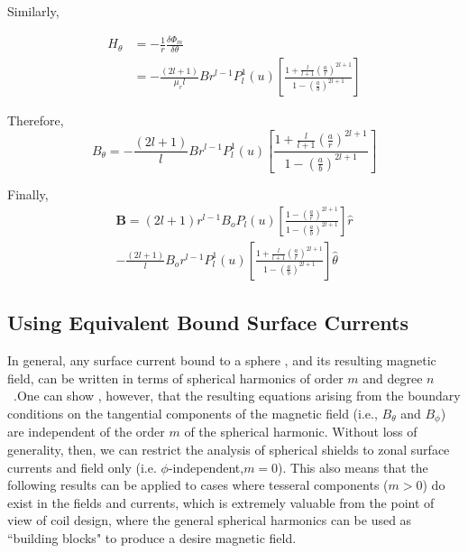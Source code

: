 Similarly,

\begin{equation}\label{Ht}
\begin{split}
 H_\theta &=-\frac{1}{r}\frac{\delta \Phi_m}{\delta \theta}\\
         & =-\frac{(2l+1)}{\mu_rl}Br^{l-1}P_l^1(u)\left[
         \frac{1+\frac{l}{l+1}\left(\frac{a}{r}\right)^{2l+1}}
         {1-\left(\frac{a}{b}\right)^{2l+1}}
         \right]
\end{split}
\end{equation}

Therefore,
\begin{equation}\label{Bt}
B_\theta=-\frac{(2l+1)}{l}Br^{l-1}P_l^1(u)\left[\frac{1+\frac{l}{l+1}\left(\frac{a}{r}\right)^{2l+1}}{1-\left(\frac{a}{b}\right)^{2l+1}}\right]
\end{equation}

Finally,
\begin{multline}\label{B}
\bm{B}=(2l+1)r^{l-1}B_o P_l(u)\left[\frac{1-\left(\frac{a}{r}\right)^{2l+1}}{1-\left(\frac{a}{b}\right)^{2l+1}}\right] \hat{r} \\ -\frac{(2l+1)}{l}B_o r^{l-1}P_l^1(u)\left[\frac{1+\frac{l}{l+1}\left(\frac{a}{r}\right)^{2l+1}}{1-\left(\frac{a}{b}\right)^{2l+1}}\right] \hat{\theta}
\end{multline}



\subsection{Using Equivalent Bound Surface Currents}

In general, any surface current bound to a sphere , and its resulting magnetic field, can be written in terms of spherical harmonics of order $m$ and degree $n$~\cite{CB1, smythe}.One can show , however, that the resulting equations arising from the boundary conditions on the tangential components of the magnetic field (i.e., $B_\theta$  and $B_\phi$) are independent of the order $m$ of the spherical harmonic. Without loss of generality, then, we can restrict the analysis of spherical shields to zonal surface currents and field only (i.e. $\phi$-independent,$m=0$). This also means that the following results can be applied to cases where tesseral components ($m > 0$) do exist in the fields and currents, which is extremely valuable from the point of view of coil design, where the general spherical harmonics can be used as ``building blocks" to produce a desire magnetic field.

